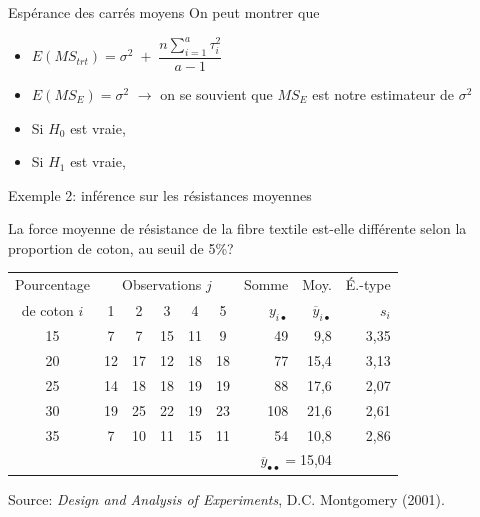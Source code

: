 \documentclass{BeamerTemplate}
\begin{document}
\begin{frame}{Espérance des carrés moyens}
On peut montrer que
\vspace{0.3cm}

\begin{itemize}\itemsep1cm
\item[$\bullet$] $E(MS_{trt})=\sigma^2\;+\; \dfrac{n\sum\limits_{i=1}^a \tau_i^2}{a-1}$
\item[$\bullet$] $E(MS_{E})=\sigma^2$ $\rightarrow$ on se souvient que $MS_E$ est notre estimateur de $\sigma^2$
\item[$\bullet$] Si $H_0$ est vraie,
\item[$\bullet$] Si $H_1$ est vraie,
\end{itemize}
\vspace{1cm}

\end{frame}

\begin{frame}[t]{Exemple 2: inférence sur les résistances moyennes}

{\small
La force moyenne de résistance de la  fibre textile est-elle différente selon la proportion de coton, au seuil de 5\%? \\

\medskip
\begin{center}
\begin{tabular}{c|ccccc|rrr}\hline
Pourcentage & \multicolumn{5}{c|}{Observations $j$} & Somme & Moy.& É.-type\\
de coton $i$ & 1 & 2 & 3 & 4 & 5 & $y_{i\bullet}$ & $\overline{y}_{i\bullet}$ & $s_i$\\ \hline
15 & 7 & 7 & 15 & 11 & 9 & 49 & 9,8 &3,35\\[1mm]
20 & 12 & 17 & 12 & 18 & 18 & 77 & 15,4 &3,13\\[1mm]
25 & 14 & 18 & 18 & 19 & 19 & 88 & 17,6&2,07 \\[1mm]
30 & 19 & 25 & 22 & 19 & 23 & 108 & 21,6&2,61 \\[1mm]
35 & 7 & 10 & 11 & 15 & 11 & 54 & 10,8 &2,86\\ \hline
&&&&&&\multicolumn{2}{r}{$\overline{y}_{\bullet\bullet}=$15,04}
\end{tabular}
\end{center}
}

\vfill
{\tiny Source: {\it Design and Analysis of Experiments}, D.C. Montgomery (2001).}
\end{frame}
\end{document}
